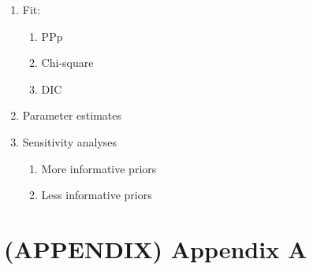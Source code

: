 \documentclass[
]{book}
\providecommand{\tightlist}{%
  \setlength{\itemsep}{0pt}\setlength{\parskip}{0pt}}
\begin{document}
\begin{enumerate}
\begin{enumerate}
    \begin{enumerate}
    \def\labelenumiii{\arabic{enumiii}.}
    \tightlist
    \item
      First and last box creates polygons for the first and last third of the samples
    \end{enumerate}
  \end{enumerate}
\item
  Fit:

  \begin{enumerate}
  \def\labelenumii{\arabic{enumii}.}
  \tightlist
  \item
    PPp
  \item
    Chi-square
  \item
    DIC
  \end{enumerate}
\item
  Parameter estimates
\item
  Sensitivity analyses

  \begin{enumerate}
  \def\labelenumii{\arabic{enumii}.}
  \tightlist
  \item
    More informative priors
  \item
    Less informative priors
  \end{enumerate}
\end{enumerate}

\chapter{(APPENDIX) Appendix A}\label{appendix-appendix-a}



\printindex
\end{document}
